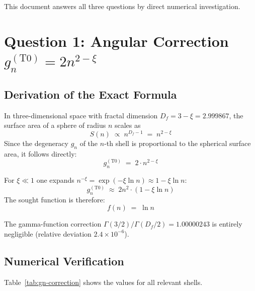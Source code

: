 This document answers all three questions by direct numerical investigation.

\section{Question 1: Angular Correction \texorpdfstring{$g_n^{(\mathrm{T0})} = 2n^{2-\xi}$}{}}
\label{sec:angular-correction}

\subsection{Derivation of the Exact Formula}
\label{subsec:derivation-gn}

In three-dimensional space with fractal dimension
$D_f = 3 - \xi = 2.999867$, the surface area of a sphere of radius $n$
scales as
\begin{equation}
  S(n) \;\propto\; n^{D_f - 1} \;=\; n^{2 - \xi}
\end{equation}
Since the degeneracy $g_n$ of the $n$-th shell is proportional to
the spherical surface area, it follows directly:
\begin{equation}
  \boxed{g_n^{(\mathrm{T0})} \;=\; 2 \cdot n^{2-\xi}}
  \label{eq:gn-T0}
\end{equation}

For $\xi \ll 1$ one expands $n^{-\xi} = \exp(-\xi \ln n) \approx 1 - \xi \ln n$:
\begin{equation}
  g_n^{(\mathrm{T0})} \;\approx\; 2n^2 \cdot (1 - \xi \ln n)
  \label{eq:gn-approx}
\end{equation}
The sought function is therefore:
\begin{equation}
  f(n) \;=\; \ln n
\end{equation}

The gamma-function correction $\Gamma(3/2)/\Gamma(D_f/2) = 1.00000243$
is entirely negligible (relative deviation $2.4 \times 10^{-6}$).

\subsection{Numerical Verification}
\label{subsec:numerics-gn}

Table~\ref{tab:gn-correction} shows the values for all relevant shells.

